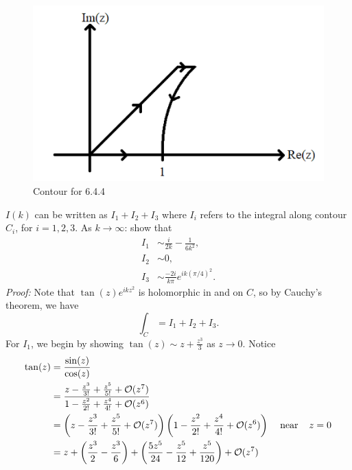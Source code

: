 \documentclass{article}
\begin{document}
\begin{itemize}
\begin{itemize}
        \begin{figure}
            \centering
            \includegraphics[scale = 0.8]{prob4contour.png}
            \caption{Contour for 6.4.4}
        \end{figure}
        $I(k)$ can be written as $I_1 + I_2 + I_3$ where $I_i$ refers to the integral along contour $C_i$, for $i = 1,2,3$. As $k \to \infty$: show that
        \begin{align*}
            I_1 &\sim \frac{i}{2k} - \frac{1}{6k^2},\\
            I_2 &\sim 0,\\
            I_3 &\sim \frac{-2i}{k\pi}e^{ik(\pi/4)^2}.
        \end{align*}
        \newline\newline
        \textit{Proof:} Note that $\tan(z)e^{ikz^2}$ is holomorphic in and on $C$, so by Cauchy's theorem, we have
        \[\int_C = I_1 + I_2 + I_3.\]
        For $I_1$, we begin by showing $\tan(z) \sim z + \frac{z^3}{3}$ as $z \to 0$. Notice
        \begin{align*}
            \tan(z) &= \frac{\sin(z)}{\cos(z)}\\
            &= \frac{z - \frac{z^3}{3!} + \frac{z^5}{5!} + \mathcal{O}(z^7)}{1 - \frac{z^2}{2!} + \frac{z^4}{4!} + \mathcal{O}(z^6)}\\
            &= \left(z - \frac{z^3}{3!} + \frac{z^5}{5!} + \mathcal{O}(z^7)\right)\left(1 - \frac{z^2}{2!} + \frac{z^4}{4!} + \mathcal{O}(z^6)\right) \hspace{0.4cm} \text{near} \hspace{0.4cm} z = 0\\
            &= z + \left(\frac{z^3}{2} - \frac{z^3}{6}\right) + \left(\frac{5z^5}{24} - \frac{z^5}{12} + \frac{z^5}{120}\right) + \mathcal{O}(z^7)\\

\end{align*}
\end{itemize}
\end{itemize}
\end{document}
